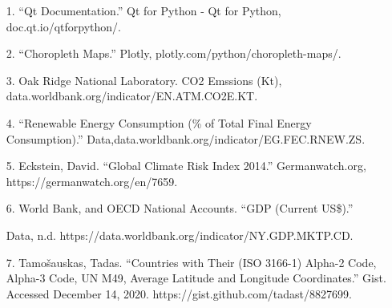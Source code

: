 \documentclass[fontsize=11pt]{article}
\begin{document}
    \begin{enumerate}
    	\item[1.] “Qt Documentation.” Qt for Python - Qt for Python, doc.qt.io/qtforpython/.
    	
    	 \item[2.] “Choropleth Maps.” Plotly, plotly.com/python/choropleth-maps/.
    	 
    	 \item[3.] Oak Ridge National Laboratory. CO2 Emssions (Kt), data.worldbank.org/indicator/EN.ATM.CO2E.KT.
    	 
    	 \item[4.] “Renewable Energy Consumption
    	 (\% of Total Final Energy Consumption).” Data,\newline data.worldbank.org/indicator/EG.FEC.RNEW.ZS.
    	 
    	 \item[5.] Eckstein, David. “Global Climate Risk Index 2014.” Germanwatch.org, https://germanwatch.org/en/7659.
    	 
    	 \item[6.] World Bank, and OECD National Accounts. “GDP (Current US\$).”
    	 
    	  Data, n.d. https://data.worldbank.org/indicator/NY.GDP.MKTP.CD.
    	 
    	 \item[7.] Tamošauskas, Tadas. “Countries with Their (ISO 3166-1) Alpha-2 Code, Alpha-3 Code, UN M49, Average Latitude and Longitude Coordinates.” Gist. Accessed December 14, 2020. https://gist.github.com/tadast/8827699. 
    \end{enumerate}
\end{document}
